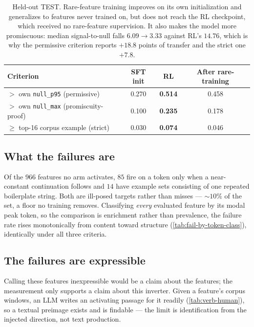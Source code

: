 \begin{table}[htbp]
\centering
\begin{tabular}{lccc}
\toprule
Criterion & SFT init & RL & After rare-training \\
\midrule
$>$ own \texttt{null\_p95} (permissive)        & 0.270 & \textbf{0.514} & 0.458 \\
$>$ own \texttt{null\_max} (promiscuity-proof) & 0.100 & \textbf{0.235} & 0.178 \\
$\geq$ top-16 corpus example (strict)          & 0.030 & \textbf{0.074} & 0.046 \\
\bottomrule
\end{tabular}
\caption{Held-out TEST. Rare-feature training improves on its own initialization and generalizes to
features never trained on, but does not reach the RL checkpoint, which received no rare-feature
supervision. It also makes the model more promiscuous: median signal-to-null falls $6.09 \rightarrow
3.33$ against RL's $14.76$, which is why the permissive criterion reports $+18.8$ points of transfer
and the strict one $+7.8$.}
\label{tab:verb-rare}
\end{table}

\subsection{What the failures are}
\label{app:verb-failures}

Of the $966$ features no arm activates, $85$ fire on a token only when a near-constant continuation
follows and $14$ have example sets consisting of one repeated boilerplate string. Both are ill-posed
targets rather than misses --- ${\sim}10\%$ of the set, a floor no training removes. Classifying
\emph{every} evaluated feature by its modal peak token, so the comparison is enrichment rather than
prevalence, the failure rate rises monotonically from content toward structure
(\cref{tab:fail-by-token-class}), identically under all three criteria.

\subsection{The failures are expressible}
\label{app:verb-human}

Calling these features inexpressible would be a claim about the features; the measurement only
supports a claim about this inverter. Given a feature's corpus windows, an LLM writes an activating
passage for it readily (\cref{tab:verb-human}), so a textual preimage exists and is findable --- the
limit is identification from the injected direction, not text production.

